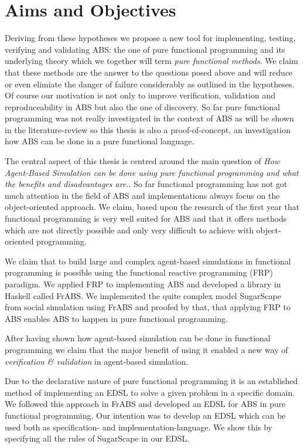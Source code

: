 \chapter{Aims and Objectives}

Deriving from these hypotheses we propose a new tool for implementing, testing, verifying and validating ABS: the one of pure functional programming and its underlying theory which we together will term \textit{pure functional methods}. We claim that these methods are the answer to the questions posed above and will reduce or even elimiate the danger of failure considerably as outlined in the hypotheses. 
Of course our motivation is not only to improve verification, validation and reproduceability in ABS but also the one of discovery. So far pure functional programming was not really investigated in the context of ABS as will be shown in the literature-review so this thesis is also a proof-of-concept, an investigation how ABS can be done in a pure functional language.

The central aspect of this thesis is centred around the main question of \textit{How Agent-Based Simulation can be done using pure functional programming and what the benefits and disadvantages are.}. So far functional programming has not got much attention in the field of ABS and implementations always focus on the object-oriented approach. We claim, based upon the research of the first year that functional programming is very well suited for ABS and that it offers methods which are not directly possible and only very difficult to achieve with object-oriented programming.

We claim that to build large and complex agent-based simulations in functional programming is possible using the functional reactive programming (FRP) paradigm. We applied FRP to implementing ABS and developed a library in Haskell called FrABS. We implemented the quite complex model SugarScape from social simulation using FrABS and proofed by that, that applying FRP to ABS enables ABS to happen in pure functional programming.

After having shown how agent-based simulation can be done in functional programming we claim that the major benefit of using it enabled a new way of \textit{verification \& validation} in agent-based simulation. 

Due to the declarative nature of pure functional programming it is an established method of implementing an EDSL to solve a given problem in a specific domain. We followed this approach in FrABS and developed an EDSL for ABS in pure functional programming. Our intention was to develop an EDSL which can be used both as specification- and implementation-language. We show this by specifying all the rules of SugarScape in our EDSL.

